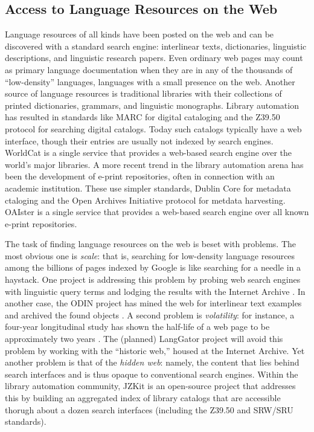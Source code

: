 \subsection{Access to Language Resources on the Web}


Language resources of all kinds have been posted on the web and can be
discovered with a standard search engine: interlinear texts,
dictionaries, linguistic descriptions, and linguistic research papers.
Even ordinary web pages may count as primary language documentation
when they are in any of the thousands of ``low-density'' languages,
languages with a small presence on the web.  Another source of
language resources is traditional libraries with their collections of
printed dictionaries, grammars, and linguistic monographs.  Library
automation has resulted in standards like MARC for digital cataloging
and the Z39.50 protocol for searching digital catalogs. Today such
catalogs typically have a web interface, though their entries are
usually not indexed by search engines.  WorldCat is a single service
that provides a web-based search engine over the world's major
libraries. A more recent trend in the library automation arena has
been the development of e-print repositories, often in connection with
an academic institution.  These use simpler standards, Dublin Core for
metadata ctaloging and the Open Archives Initiative protocol for
metdata harvesting.  OAIster is a single service that provides a
web-based search engine over all known e-print repositories.


The task of finding language resources on the web is beset with
problems.  The most obvious one is \emph{scale}: that is, searching for
low-density language resources among the billions of pages indexed
by Google is like searching for a needle in a haystack.  One project is
addressing this problem by probing web search engines with linguistic
query terms and lodging the results with the Internet Archive
\citep{BaldwinBird06}. In another case, the ODIN project has mined
the web for interlinear text examples and archived the found objects
\citep{Langendoen02,Lewis03}.  A second problem is \emph{volatility}:
for instance, a four-year longitudinal study has shown the half-life
of a web page to be approximately two years \cite{Koehler02}.
The (planned) LangGator project will avoid this problem by working
with the ``historic web,'' housed at the Internet Archive.  Yet
another problem is that of the
\emph{hidden web}: namely, the content that lies behind search
interfaces and is thus opaque to conventional search engines.
Within the library automation community, JZKit is an open-source project
that addresses this by building an aggregated index of library
catalogs that are accessible thorugh about a dozen search interfaces
(including the Z39.50 and SRW/SRU standards).

